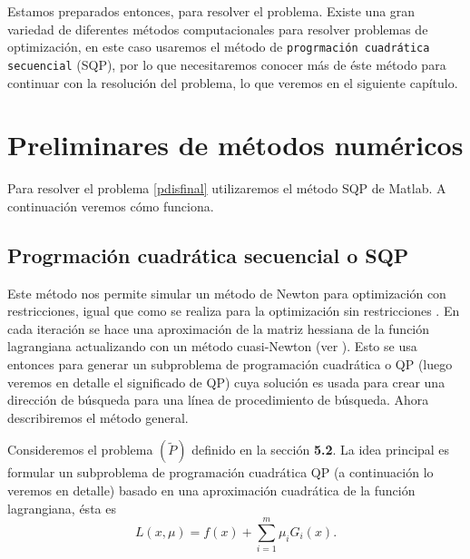 \documentclass[a4paper,10pt]{book}
\begin{document}



Estamos preparados entonces, para resolver el problema. Existe una gran variedad de diferentes métodos computacionales para resolver problemas de optimización, en este caso usaremos el método de \texttt{progrmación cuadrática secuencial} (SQP), por lo que necesitaremos conocer más de éste método para continuar con la resolución del problema, lo que veremos en el siguiente capítulo.

\chapter{Preliminares de métodos numéricos}

Para resolver el problema \eqref{pdisfinal} utilizaremos el método SQP de Matlab. A continuación veremos cómo funciona.
\section{Progrmación cuadrática secuencial o SQP}
Este método nos permite simular un método de Newton para optimización con restricciones, igual que como se realiza para la optimización sin restricciones \cite[Section 1.4.]{bertsekas1999nonlinear}. En cada iteración se hace una aproximación de la matriz hessiana de la función lagrangiana actualizando con un método cuasi-Newton (ver \cite[Section 1.7.]{bertsekas1999nonlinear}). Esto se usa entonces para generar un subproblema de programación cuadrática o QP (luego veremos en detalle el significado de QP) cuya solución es usada para crear una dirección de búsqueda para una línea de procedimiento de búsqueda. Ahora describiremos el método general.

Consideremos el problema $(\tilde{P})$ definido en la sección \textbf{5.2}. La idea principal es formular un subproblema de programación cuadrática QP (a continuación lo veremos en detalle) basado en una aproximación cuadrática de la función lagrangiana, ésta es 
\begin{equation}\label{funlag}
L(x,\mu)=f(x)+\sum_{i=1}^m\mu_iG_i(x).
\end{equation}
\end{document}
